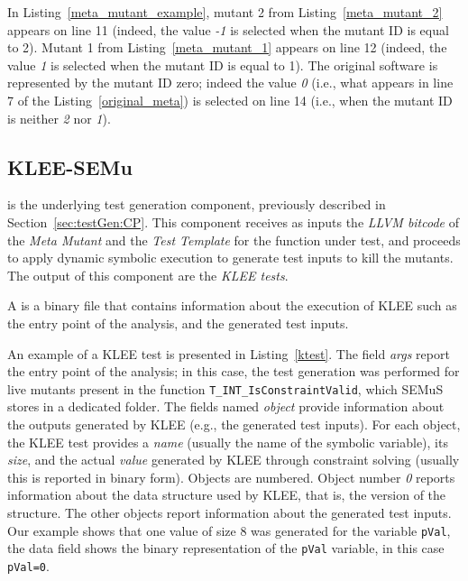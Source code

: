 In Listing~\ref{meta_mutant_example}, mutant 2 from Listing~\ref{meta_mutant_2} appears on line 11 (indeed, the value \emph{-1} is selected when the mutant ID is equal to 2). Mutant 1 from Listing~\ref{meta_mutant_1} appears on line 12 (indeed, the value \emph{1} is selected when the mutant ID is equal to 1). The original software is represented by the mutant ID zero; indeed the value \emph{0} (i.e., what appears in line 7 of the Listing~\ref{original_meta}) is selected on line 14 (i.e., when the mutant ID is neither \emph{2} nor \emph{1}).

\subsection{KLEE-SEMu}



 is the underlying test generation component, previously described in Section~\ref{sec:testGen:CP}. This component receives as inputs the \emph{LLVM bitcode} of the \emph{Meta Mutant} and the \emph{Test Template} for the function under test, and proceeds to apply dynamic symbolic execution to generate test inputs to kill the mutants. The output of this component are the \emph{KLEE tests}.

A  is a binary file that contains information about the execution of KLEE such as the entry point of the analysis, and the generated test inputs.


An example of a KLEE test is presented in Listing~\ref{ktest}. The field \emph{args} report the entry point of the analysis; in this case, the test generation was performed for live mutants present in the function \texttt{T\_INT\_Is\-Constraint\-Valid}, which SEMuS stores in a dedicated folder. The fields named \emph{object} provide information about the outputs generated by KLEE (e.g., the generated test inputs). 
For each object, the KLEE test provides a \emph{name} (usually the name of the symbolic variable), its \emph{size}, and the actual \emph{value} generated by KLEE through constraint solving (usually this is reported in binary form).
Objects are numbered. Object number \emph{0} reports information about the data structure used by KLEE, that is, the version of the structure. The other objects report information about the generated test inputs.
Our example shows that one value of size 8 was generated for the variable \texttt{pVal}, the data field shows the binary representation of the \texttt{pVal} variable, in this case \texttt{pVal=0}.

